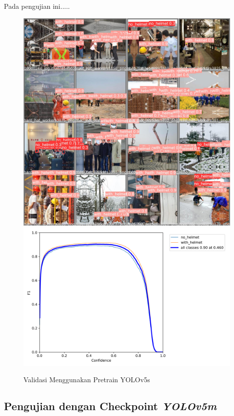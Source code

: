 Pada pengujian ini.....

\begin{figure}[ht]
  \centering
  \includegraphics[scale=0.1]{gambar/train_v2_val/HelmetDetection_yolov5s/val_batch0_pred.jpg}
  \includegraphics[scale=0.3]{gambar/train_v2_val/HelmetDetection_yolov5s/F1_curve.png}
  \caption{Validasi Menggunakan Pretrain YOLOv5s}
  \label{fig:valyolov5s}  
\end{figure}

\subsection{Pengujian dengan Checkpoint \emph{YOLOv5m}}
\label{subsec:ujiyolo5m}

